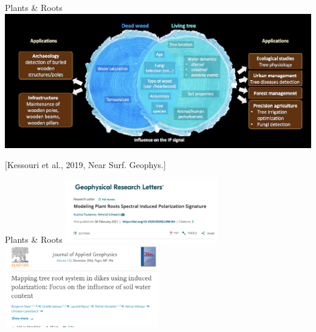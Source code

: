 \begin{frame}{Plants \& Roots}
      \includegraphics[width=1.0\textwidth]{Figures/InducedPolarization/IP_Tree_Kessouri2019_NearSurfaceGeophysics.png}
    
  
    \tiny [Kessouri et al., 2019, Near Surf. Geophys.]
  \end{frame}

  \begin{frame}{Plants \& Roots}
        \includegraphics[width=0.5\textwidth]{Figures/InducedPolarization/IPRoots_2021.png}
        \includegraphics[width=0.5\textwidth]{Figures/InducedPolarization/IPRoots2_2021.png}
      
    
    \end{frame}

